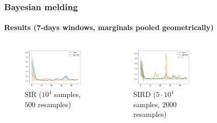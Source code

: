\documentclass[aspectratio=43]{beamer}
\begin{document}
\begin{frame}
	\frametitle{Bayesian melding}
	\framesubtitle{Results (7-days windows, marginals pooled geometrically)}
	\begin{columns}
		\begin{figure}
			\includegraphics[width=\textwidth]{img/sir_meld_7_log.png}
			\caption{SIR ($10^4$ samples, $500$ resamples)}
		\end{figure}
		\begin{figure}
			\includegraphics[width=\textwidth]{img/sird_meld_7_log.png}
			\caption{SIRD ($5 \cdot 10^4$ samples, $2000$ resamples)}
		\end{figure}
		\begin{figure}

\end{figure}
\end{columns}
\end{frame}
\end{document}

